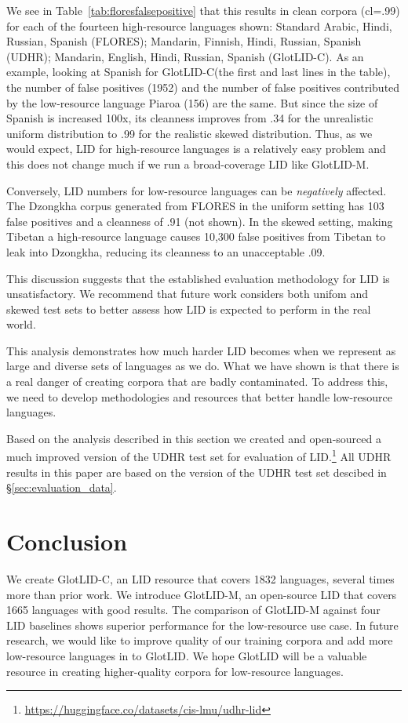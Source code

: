\documentclass[11pt]{article}
\def\numberlanguagesaccurate{1665\xspace}
\def\numberlanguagestotal{1832\xspace}
\def\modelname{\mbox{GlotLID-M}\xspace}
\def\corpusname{\mbox{GlotLID-C}\xspace}
\def\genericname{\mbox{GlotLID}\xspace}
\def\flores{FLORES\xspace}
\def\udhr{UDHR\xspace}
\def\tabref#1{Table~\ref{tab:#1}}
\def\secref#1{\S\ref{sec:#1}}
\begin{document}
We see in \tabref{floresfalsepositive} that this results in
clean corpora (cl=.99) for each of
the fourteen
high-resource languages shown: Standard Arabic, Hindi,
Russian, Spanish (\flores); Mandarin, Finnish, Hindi,
Russian, Spanish (\udhr); Mandarin, English, Hindi, Russian,
Spanish (\corpusname). As an example, looking at Spanish for
\corpusname (the first
and last lines in the table), the number of false positives
(1952) and the number of false positives contributed by the
low-resource language Piaroa (156) are the same. But since
the size of Spanish is increased 100x, its
cleanness improves from .34 for the unrealistic
uniform distribution to .99 for the realistic skewed
distribution. Thus, as we would
expect, LID for high-resource languages is a relatively  easy
problem and this does not change much if we run a
broad-coverage LID like \modelname.

Conversely, LID numbers for low-resource languages can be
\emph{negatively} affected.
The Dzongkha corpus generated from \flores
in the uniform setting has 103 false positives and a
cleanness of .91 (not shown). In the skewed setting, 
making Tibetan a high-resource language causes 10,300 false
positives from Tibetan to leak into Dzongkha, reducing its cleanness to an unacceptable .09. 

This discussion suggests that the established evaluation
methodology for LID is unsatisfactory. We recommend that
future work considers both unifom and skewed test sets to
better assess how LID is expected to perform in the real world.

This analysis  demonstrates
how much harder LID becomes
when we represent as large and diverse sets of languages as we do. What
we have shown is that there is a real danger of creating
corpora that are badly contaminated.
To address this, we
need to develop methodologies and resources that better handle
low-resource languages.


Based on the analysis described in this section we created
and open-sourced a much improved version of the UDHR test
set for evaluation of
LID.\footnote{\url{https://huggingface.co/datasets/cis-lmu/udhr-lid}}
All UDHR results in this paper are based on the version of
the UDHR test set descibed in \secref{evaluation_data}.



\section{Conclusion}
We create \corpusname, an  LID resource that
covers \numberlanguagestotal languages, several times more than prior
work.
We introduce \modelname, an open-source LID that
covers \numberlanguagesaccurate languages with good results.
The comparison of \modelname
against four  LID baselines shows
superior performance
for the low-resource use case. 
In future research, we would like to improve quality of our training corpora and add more low-resource languages in to \genericname.
We hope \genericname will
be a valuable
resource in creating higher-quality corpora for low-resource languages.
\end{document}
